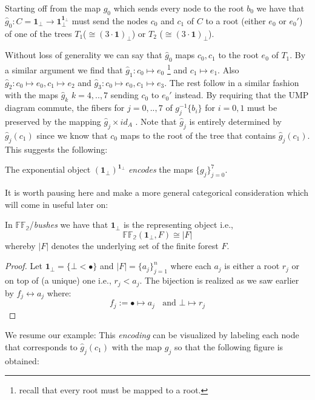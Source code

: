Starting off from the map $g_0$ which sends every node to the root $b_0$ we have that $\hat{g}_0 : C=\textbf{1}_\bot \rightarrow \textbf{1}_\bot^{\textbf{1}_\bot}$ must send the nodes $c_0$ and $c_1$ of $C$ to a root (either $e_0$ or $e_0'$) of one of the trees $T_1$($\cong (3\cdot\textbf{1})_\bot$) or $T_2$ ($\cong (3\cdot\textbf{1})_\bot$). \newline

Without loss of generality we can say that $\hat{g}_0$ maps $c_0,c_1$ to the root $e_0$ of $T_1$. \newline
By a similar argument we find that $\hat{g}_1 :c_0 \mapsto e_0$ \footnote{recall that every root must be mapped to a root.} and $c_1 \mapsto e_1$. \newline
Also $\hat{g}_2 : c_0 \mapsto e_0, c_1 \mapsto e_2$ and $\hat{g}_3 : c_0 \mapsto e_0, c_1 \mapsto e_3$.   
The rest follow in a similar fashion with the maps $\hat{g}_k$ $k=4,..,7$ sending $c_0$ to $e_0'$ instead.\newline
By requiring that the UMP diagram commute, the fibers for $j=0,..,7$ of $g_j^{-1}\{b_i\}$ for $i=0,1$ must be preserved by the mapping $\hat{g}_j \times id_A$ .
\newpage
Note that $\hat{g}_j$ is entirely determined by $\hat{g}_j(c_1)$ since we know that $c_0$ maps to the root of the tree that contains $\hat{g}_j(c_1)$.
This suggests the following:
\begin{lem}
	The exponential object $(\textbf{1}_\bot) ^ {\textbf{1}_\bot}$ \emph{encodes} the maps $\{g_j\}_{j=0}^7$.
\end{lem}
It is worth pausing here and make a more general categorical consideration which will come in useful later on:
 \begin{prop}\label{representing}
 	In $\mathbb{FF_2}$/\emph{bushes} we have that $\textbf{1}_\bot$ is the representing object i.e., 
 	\[ \mathbb{FF_2}(\textbf{1}_\bot, F) \cong |F| \]
 	whereby $|F|$ denotes the underlying set of the finite forest $F$.
 \end{prop}
 \begin{proof}
 	Let $\textbf{1}_\bot = \{ \bot < \bullet\}$ and $|F| = \{a_j\}_{j=1}^n$ where each $a_j$ is either
 	a root $r_j$ or on top of (a unique) one i.e., $r_j < a_j$. \newline
 	The bijection is realized as we saw earlier by $f_j \leftrightarrow a_j$ where:
 	\[f_j := \bullet \mapsto a_j \;\;\text{ and } \bot \mapsto r_j\]
 \end{proof}
 
 
We resume our example: \newline
  This \emph{encoding} can be visualized by labeling each node that corresponds to $\hat{g}_j(c_1)$ with the map $g_j$ so that the following figure is obtained:

